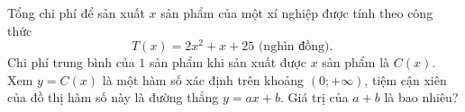 \begin{bt}%
	Tổng chi phí để sản xuất $x$ sản phẩm của một xí nghiệp được tính theo công thức
	\[T(x)=2 x^2+x+25 \text { (nghìn đồng). }\]
	Chi phí trung bình của $1$ sản phẩm khi sản xuất được $x$ sản phẩm là $C(x)$. Xem $y=C(x)$ là một hàm số xác định trên khoảng $(0 ;+\infty)$, tiệm cận xiên của đồ thị hàm số này là đường thẳng $y=ax+b$. Giá trị của $a+b$ là bao nhiêu?
\end{bt}

